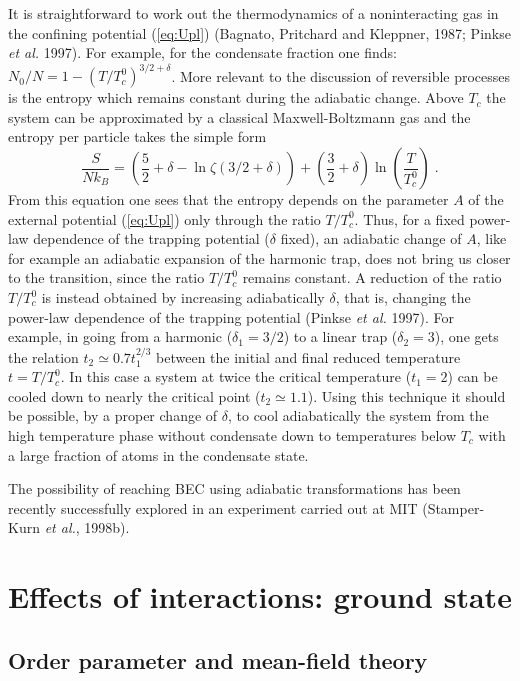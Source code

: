 It is straightforward  to work out the thermodynamics of a
noninteracting gas in the confining potential (\ref{eq:Upl}) (Bagnato, 
Pritchard and Kleppner, 1987;  Pinkse {\it et al.} 1997). For example,  
for the condensate fraction one finds: $N_0/N=1-(T/T_c^0)^{3/2+\delta}$.
More relevant to the discussion of reversible processes is the 
entropy which remains constant during the adiabatic change.
Above $T_c$ the system can be approximated by a classical
Maxwell-Boltzmann gas and the entropy per particle takes the simple
form
\begin{equation}
\frac{S}{Nk_B} = \left( \frac{5}{2}+\delta-\ln \zeta(3/2+\delta) \right)
+ \left(\frac{3}{2}+\delta\right) \ln \left(\frac{T}{T_c^0}\right) \;.
\label{Spl}
\end{equation}
\noindent From this equation one sees that the entropy depends on the
parameter $A$ of the external potential (\ref{eq:Upl}) only through the
ratio $T/T_c^0$. Thus, for a fixed power-law dependence of the trapping
potential ($\delta$ fixed), an adiabatic change of $A$, like for example
an adiabatic expansion of the harmonic trap, does not bring us closer
to the transition, since the ratio $T/T_c^0$ remains constant. A reduction 
of the ratio $T/T_c^0$ is instead obtained by increasing
adiabatically $\delta$, that is,  changing the power-law dependence
of the trapping potential (Pinkse {\it et al.} 1997). For example, in
going from a harmonic ($\delta_1=3/2$) to a linear trap ($\delta_2=3$), 
one gets the relation $t_2\simeq 0.7 t_1^{2/3}$ between the initial and
final reduced temperature $t=T/T_c^0$. In this case a system at twice
the critical temperature ($t_1=2$) can be cooled down to nearly the
critical point ($t_2\simeq 1.1$).  Using this technique it should be
possible, by a proper change of $\delta$, to cool adiabatically the
system from the high temperature phase without condensate down to
temperatures below $T_c$ with a large fraction of atoms in the condensate
state. 

The possibility of reaching BEC using adiabatic transformations has 
been recently successfully explored in an experiment carried out at MIT 
(Stamper-Kurn {\it et al.}, 1998b).        


\section{Effects of interactions: ground state}
\label{sec:groundstate}

\subsection{Order parameter and mean-field theory} 
\label{sec:manybody}

